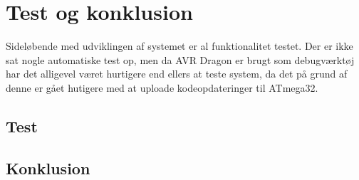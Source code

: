 \section{Test og konklusion}

Sideløbende med udviklingen af systemet er al funktionalitet testet. Der er ikke sat nogle automatiske test op, men da AVR Dragon er brugt som debugværktøj har det alligevel været hurtigere end ellers at teste system, da det på grund af denne er gået hutigere med at uploade kodeopdateringer til ATmega32.

\subsection{Test}


\subsection{Konklusion}

